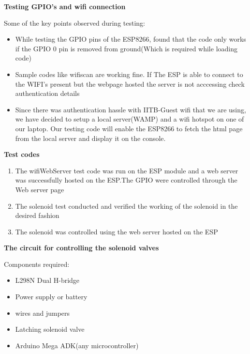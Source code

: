 \documentclass[16pt]{article}
\begin{document}
\begin{enumerate}
\vspace{0.5cm}
\textbf{Testing GPIO's and wifi connection}

Some of the key points observed during testing:

\begin{itemize}

\item
  While testing the GPIO pins of the ESP8266, found that the code only
  works if the GPIO 0 pin is removed from ground(Which is required while
  loading code)
\item
  Sample codes like wifiscan are working fine. If The ESP is able to
  connect to the WIFI's present but the webpage hosted the server is not
  acccessing check authentication details
\item
  Since there was authentication hassle with IITB-Guest wifi that we are
  using, we have decided to setup a local server(WAMP) and a wifi
  hotspot on one of our laptop. Our testing code will enable the ESP8266
  to fetch the html page from the local server and display it on the
  console.
  
\end{itemize}

\vspace{0.5cm}

\textbf{Test codes}

\begin{enumerate}

\item
  The wifiWebServer test code was run on the ESP module and a web server
  was successfully hosted on the ESP.The GPIO were controlled through
  the Web server page
\item
  The solenoid test conducted and verified the working of the solenoid
  in the desired fashion
\item
  The solenoid was controlled using the web server hosted on the ESP
\end{enumerate}

\vspace{0.5cm}

{\Large{\item{\textbf{The circuit for controlling the solenoid valves}}} }

Components required:

\begin{itemize}

\item
  L298N Dual H-bridge
\item
  Power supply or battery
\item
  wires and jumpers
\item
  Latching solenoid valve
\item
  Arduino Mega ADK(any microcontroller)
\end{itemize}


\end{enumerate}
\end{document}
